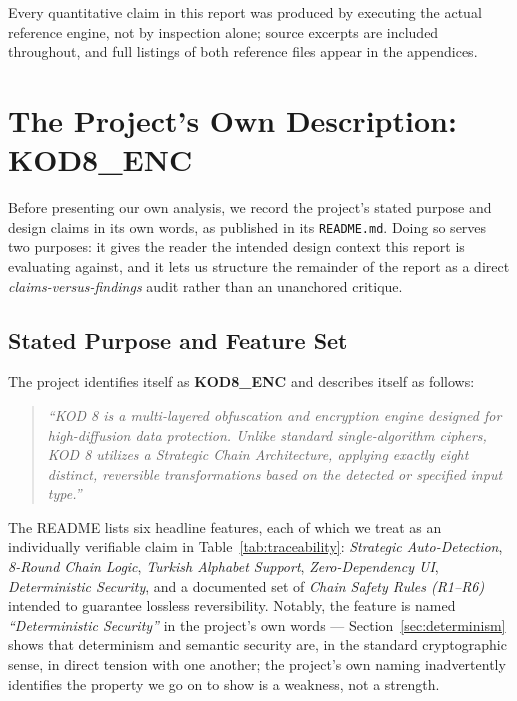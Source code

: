 \documentclass[11pt]{article}
\begin{document}
Every quantitative claim in this report was produced by executing the
actual reference engine, not by inspection alone; source excerpts are
included throughout, and full listings of both reference files appear
in the appendices.

\section{The Project's Own Description: KOD8\_ENC}
\label{sec:readme}

Before presenting our own analysis, we record the project's stated
purpose and design claims in its own words, as published in its
\texttt{README.md}. Doing so serves two purposes: it gives the reader
the intended design context this report is evaluating against, and it
lets us structure the remainder of the report as a direct
\emph{claims-versus-findings} audit rather than an unanchored critique.

\subsection{Stated Purpose and Feature Set}

The project identifies itself as \textbf{KOD8\_ENC} and describes
itself as follows:

\begin{quote}
\itshape
``KOD 8 is a multi-layered obfuscation and encryption engine designed
for high-diffusion data protection. Unlike standard single-algorithm
ciphers, KOD 8 utilizes a Strategic Chain Architecture, applying
exactly eight distinct, reversible transformations based on the
detected or specified input type.''
\end{quote}

The README lists six headline features, each of which we treat as an
individually verifiable claim in Table~\ref{tab:traceability}:
\emph{Strategic Auto-Detection}, \emph{8-Round Chain Logic},
\emph{Turkish Alphabet Support}, \emph{Zero-Dependency UI},
\emph{Deterministic Security}, and a documented set of \emph{Chain
Safety Rules (R1–R6)} intended to guarantee lossless reversibility.
Notably, the feature is named \emph{``Deterministic Security''} in the
project's own words --- Section~\ref{sec:determinism} shows that
determinism and semantic security are, in the standard cryptographic
sense, in direct tension with one another; the project's own naming
inadvertently identifies the property we go on to show is a
weakness, not a strength.
\end{document}
